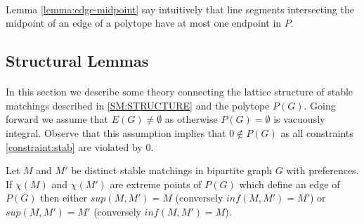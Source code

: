 \paragraph{}
Lemma \ref{lemma:edge-midpoint} say intuitively that line segments intersecting the midpoint of an edge of a polytope have at most one endpoint in $P$.
\subsection{Structural Lemmas}
\paragraph{}
In this section we describe some theory connecting the lattice structure of stable matchings described in \ref{SM:STRUCTURE} and the polytope $P(G)$. Going forward we assume that $E(G) \neq \emptyset$ as otherwise $P(G) = \emptyset$ is vacuously integral. Observe that this assumption implies that $0 \not\in P(G)$ as all constraints \ref{constraint:stab} are violated by $0$.
\begin{lemma}\label{lemma:all-same}
Let $M$ and $M'$ be distinct stable matchings in bipartite graph $G$ with preferences. If $\chi(M)$ and $\chi(M')$ are extreme points of $P(G)$ which define an edge of $P(G)$ then either $sup(M,M') = M$ (conversely $inf(M,M') = M'$) or $sup(M,M') = M'$ (conversely $inf(M,M') = M$).
\end{lemma}
